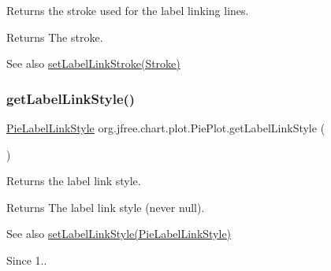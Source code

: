 Returns the stroke used for the label linking lines.

\begin{DoxyReturn}{Returns}
The stroke.
\end{DoxyReturn}
\begin{DoxySeeAlso}{See also}
\mbox{\hyperlink{classorg_1_1jfree_1_1chart_1_1plot_1_1_pie_plot_a763d73175ed86a367237e992dbd3dde6}{set\+Label\+Link\+Stroke(\+Stroke)}} 
\end{DoxySeeAlso}
\mbox{\label{classorg_1_1jfree_1_1chart_1_1plot_1_1_pie_plot_a242faf0d00119da23a81e76be5dfda47}} 
\subsubsection{\texorpdfstring{get\+Label\+Link\+Style()}{getLabelLinkStyle()}}
{\footnotesize\ttfamily \mbox{\hyperlink{classorg_1_1jfree_1_1chart_1_1plot_1_1_pie_label_link_style}{Pie\+Label\+Link\+Style}} org.\+jfree.\+chart.\+plot.\+Pie\+Plot.\+get\+Label\+Link\+Style (\begin{DoxyParamCaption}{ }\end{DoxyParamCaption})}

Returns the label link style.

\begin{DoxyReturn}{Returns}
The label link style (never {\ttfamily null}).
\end{DoxyReturn}
\begin{DoxySeeAlso}{See also}
\mbox{\hyperlink{classorg_1_1jfree_1_1chart_1_1plot_1_1_pie_plot_af484541c4d3e06c2956dd06f7e39caa2}{set\+Label\+Link\+Style(\+Pie\+Label\+Link\+Style)}}
\end{DoxySeeAlso}
\begin{DoxySince}{Since}
1.. 
\end{DoxySince}
\mbox{\label{classorg_1_1jfree_1_1chart_1_1plot_1_1_pie_plot_a61d0861c1429acfa06aa1e7a03fb877c}} 
